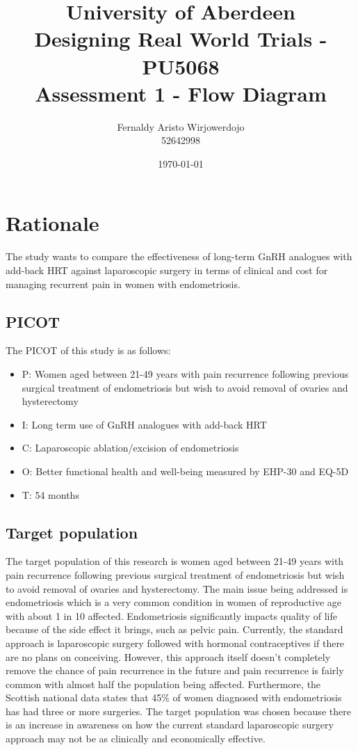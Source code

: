 \documentclass{article}
\title{University of Aberdeen\\Designing Real World Trials - PU5068\\Assessment 1 - Flow Diagram}
\author{Fernaldy Aristo Wirjowerdojo\\52642998}
\date{\today}
\begin{document}
\maketitle

\pagebreak
\section*{Rationale}
The study wants to compare the effectiveness of long-term GnRH analogues with add-back HRT against laparoscopic surgery in terms of clinical and cost for managing recurrent pain in women with endometriosis.
\subsection{PICOT}
The PICOT of this study is as follows:
\begin{itemize}
    \item P: Women aged between 21-49 years with pain recurrence following previous surgical treatment of endometriosis but wish to avoid removal of ovaries and hysterectomy
    \item I: Long term use of GnRH analogues with add-back HRT
    \item C: Laparoscopic ablation/excision of endometriosis
    \item O: Better functional health and well-being measured by EHP-30 and EQ-5D
    \item T: 54 months
\end{itemize}

\subsection{Target population}
The target population of this research is women aged between 21-49 years with pain recurrence following previous surgical treatment of endometriosis but wish to avoid removal of ovaries and hysterectomy. The main issue being addressed is endometriosis which is a very common condition in women of reproductive age with about 1 in 10 affected. Endometriosis significantly impacts quality of life because of the side effect it brings, such as pelvic pain. Currently, the standard approach is laparoscopic surgery followed with hormonal contraceptives if there are no plans on conceiving. However, this approach itself doesn't completely remove the chance of pain recurrence in the future and pain recurrence is fairly common with almost half the population being affected. Furthermore, the Scottish national data states that 45\% of women diagnosed with endometriosis has had three or more surgeries. The target population was chosen because there is an increase in awareness on how the current standard laparoscopic surgery approach may not be as clinically and economically effective.
\end{document}
